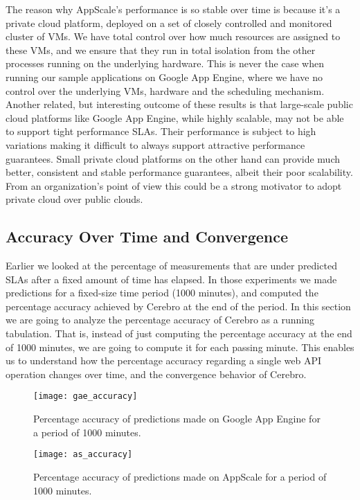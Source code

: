 The reason why AppScale's performance is so stable over time is because it's a private cloud platform, deployed on a set of closely controlled 
and monitored cluster of VMs. We have total control
over how much resources are assigned to these VMs, and we ensure that they run in total isolation from the other processes running on the underlying hardware.
This is never the case when running our sample applications on Google App Engine, where we have no control over the underlying VMs, hardware and the
scheduling mechanism. Another related, but interesting outcome of these results is that large-scale public cloud platforms like Google App Engine, while
highly scalable, may not be able to support tight performance SLAs. Their performance is subject to high variations making it difficult to always support attractive
performance guarantees. Small private cloud platforms on the other hand can provide much better, consistent and stable performance guarantees, albeit their
poor scalability. From an organization's point of view this could be a strong motivator to adopt private cloud over public clouds.

\subsection{Accuracy Over Time and Convergence}

Earlier we looked at the percentage of measurements that are under predicted SLAs after a fixed amount of time has elapsed.
In those experiments we made predictions for a fixed-size time period (1000 minutes), 
and computed the percentage accuracy achieved by Cerebro at the end of the period.
In this section we are going to analyze the percentage accuracy of Cerebro as a running tabulation. That is, instead of just
computing the percentage accuracy at the end of 1000 minutes, we are going to compute it for each passing minute. This enables us to
understand how the percentage accuracy regarding a single web API operation changes over time, and the convergence
behavior of Cerebro.

\begin{figure}
\centering
\texttt{[image: gae\_accuracy]}
\caption{Percentage accuracy of predictions made on Google App Engine for a period of 1000 minutes.}
\label{fig:gae_accuracy}
\end{figure}

\begin{figure}
\centering
\texttt{[image: as\_accuracy]}
\caption{Percentage accuracy of predictions made on AppScale for a period of 1000 minutes.}
\label{fig:as_accuracy}
\end{figure}

